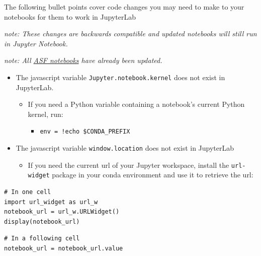 The following bullet points cover code changes you may need to make to your notebooks for them to work in JupyterLab

\textit{note: These changes are backwards compatible and updated notebooks will still run in Jupyter Notebook.}

\textit{note: All \href{https://github.com/ASFOpenSARlab/opensarlab-notebooks}{ASF notebooks} have already been updated.}

\begin{itemize}
\item The javascript variable \texttt{Jupyter.notebook.kernel} does not exist in JupyterLab.\begin{itemize}
\item If you need a Python variable containing a notebook's current Python kernel, run:\begin{itemize}
\item \texttt{env = !echo \$CONDA\_PREFIX}
\end{itemize}
\end{itemize}


\item The javascript variable \texttt{window.location} does not exist in JupyterLab\begin{itemize}
\item If you need the current url of your Jupyter workspace, install the \texttt{url-widget} package in your conda environment and use it to retrieve the url:
\end{itemize}
\end{itemize}

\begin{verbatim}
# In one cell
import url_widget as url_w
notebook_url = url_w.URLWidget()
display(notebook_url)
\end{verbatim}

\begin{verbatim}
# In a following cell
notebook_url = notebook_url.value
\end{verbatim}

